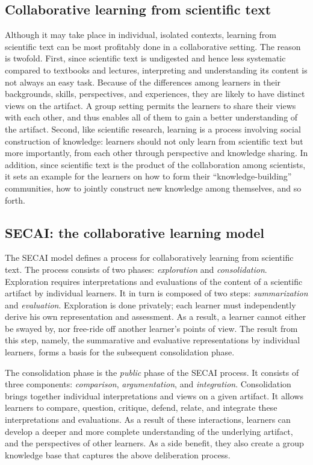 \subsection{Collaborative learning from scientific text}
\label{sec:artifact-based}

Although it may take place in individual, isolated contexts, learning from
scientific text can be most profitably done in a collaborative setting.
The reason is twofold. First, since scientific text is undigested and hence
less systematic compared to textbooks and lectures, interpreting and
understanding its content is not always an easy task.  Because of the
differences among learners in their backgrounds, skills, perspectives, and
experiences, they are likely to have distinct views on the artifact. A
group setting permits the learners to share their views with each other,
and thus enables all of them to gain a better understanding of the
artifact.  Second, like scientific research, learning is a process
involving social construction of knowledge: learners should not only learn
from scientific text but more importantly, from each other through
perspective and knowledge sharing. In addition, since scientific text is
the product of the collaboration among scientists, it sets an example for
the learners on how to form their ``knowledge-building'' communities, how
to jointly construct new knowledge among themselves, and so forth.


\subsection{SECAI: the collaborative learning model}
\label{sec:secai}

The SECAI model defines a process for collaboratively learning from
scientific text. The process consists of two phases: {\it exploration\/}
and {\it consolidation\/}. Exploration requires interpretations and
evaluations of the content of a scientific artifact by individual
learners. It in turn is composed of two steps: {\it summarization\/} and
{\it evaluation\/}. Exploration is done privately; each learner must
independently derive his own representation and assessment. As a result, a
learner cannot either be swayed by, nor free-ride off another learner's
points of view.  The result from this step, namely, the summarative and
evaluative representations by individual learners, forms a basis for the
subsequent consolidation phase.

The consolidation phase is the {\it public\/} phase of the SECAI
process. It consists of three components: {\it comparison\/}, {\it
argumentation\/}, and {\it integration\/}. Consolidation brings together
individual interpretations and views on a given artifact. It allows
learners to compare, question, critique, defend, relate, and integrate
these interpretations and evaluations. As a result of these interactions,
learners can develop a deeper and more complete understanding of the
underlying artifact, and the perspectives of other learners.  As a side
benefit, they also create a group knowledge base that captures the above
deliberation process.

